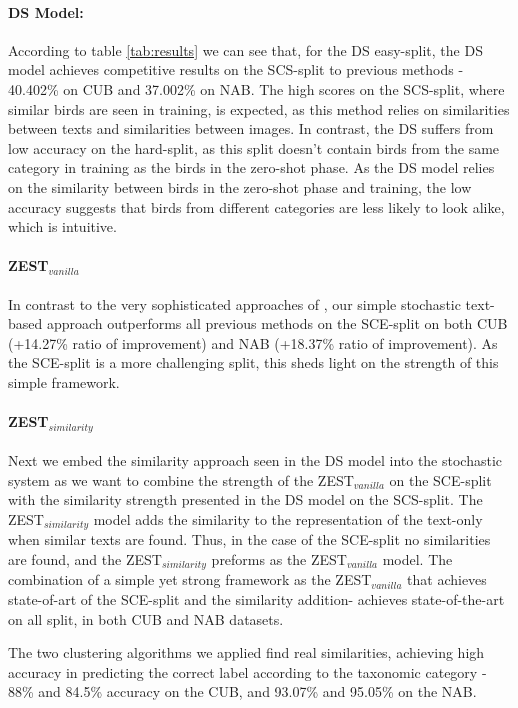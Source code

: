 \documentclass[11pt,a4paper]{article}
\begin{document}
\paragraph{DS Model:} 
According to table \ref{tab:results} we can see that, for the DS easy-split, the DS model achieves competitive results on the SCS-split to previous methods - 40.402\% on CUB and 37.002\% on NAB. The high scores on the SCS-split, where similar birds are seen in training, is expected, as this method relies on similarities between texts and similarities between images.
In contrast, the DS suffers from low accuracy on the hard-split, as this split doesn't contain birds from the same category in training as the birds in the zero-shot phase. As the DS model relies on the similarity between birds in the zero-shot phase and training, the low accuracy suggests that birds from different categories are less likely to look alike, which is intuitive. 

\paragraph{ZEST$_{vanilla}$}
In contrast to the very sophisticated approaches of \citet{zhu2018generative}, our simple stochastic text-based approach outperforms all previous methods on the SCE-split on both CUB (+14.27\% ratio of improvement) and NAB (+18.37\%  ratio of improvement). As the SCE-split is a more challenging split, this sheds light on the strength of this simple framework.  

\paragraph{ZEST$_{similarity}$}
Next we embed the similarity approach seen in the DS model into the stochastic system as we want to combine the strength of the ZEST$_{vanilla}$ on the SCE-split with the similarity strength presented in the DS model on the SCS-split.
The ZEST$_{similarity}$ model adds the similarity to the representation of the text-only when similar texts are found. Thus, in the case of the SCE-split no similarities are found, and the ZEST$_{similarity}$ preforms as the ZEST$_{vanilla}$ model. 
The combination of a simple yet strong framework as the ZEST$_{vanilla}$ that achieves state-of-art of the SCE-split and the similarity addition- achieves state-of-the-art on all split, in both CUB and NAB datasets. \par


The two clustering algorithms we applied find real similarities, achieving high accuracy in predicting the correct label according to the taxonomic category - 88\% and 84.5\% accuracy on the CUB, and 93.07\% and 95.05\% on the NAB. 
\end{document}
